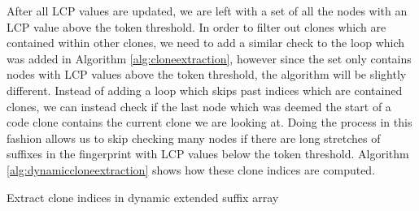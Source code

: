 After all LCP values are updated, we are left with a set of all the nodes with an LCP
value above the token threshold. In order to filter out clones which are contained within
other clones, we need to add a similar check to the loop which was added in Algorithm
\ref{alg:cloneextraction}, however since the set only contains nodes with LCP values above
the token threshold, the algorithm will be slightly different. Instead of adding a loop
which skips past indices which are contained clones, we can instead check if the last node
which was deemed the start of a code clone contains the current clone we are looking at.
Doing the process in this fashion allows us to skip checking many nodes if there are long
stretches of suffixes in the fingerprint with LCP values below the token threshold.
Algorithm \ref{alg:dynamiccloneextraction} shows how these clone indices are computed.

\begin{algorithm}[t]
  \SetAlgoLined\DontPrintSemicolon

  \vspace{0.5cm}
  \caption{Extract clone indices in dynamic extended suffix array}
  \label{alg:dynamiccloneextraction}
\end{algorithm}

